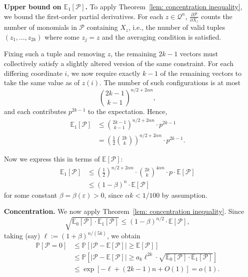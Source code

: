 \documentclass[11pt]{article}
\theoremstyle{definition}
\theoremstyle{plain}
\begin{document}
\vspace{.1 in}

{\bf Upper bound on \( \mathbb{E}_1[\mathcal{P}] \).}
To apply Theorem~\ref{lem: concentration inequality}, we bound the first-order partial derivatives. For each \( z \in \mathcal{Q}^n \), \( \frac{\partial \mathcal{P}}{\partial X_z} \) counts the number of monomials in \( \mathcal{P} \) containing \( X_z \), i.e., the number of valid tuples \( (z_1, \ldots, z_{2k}) \) where some \( z_j = z \) and the averaging condition is satisfied.

Fixing such a tuple and removing \( z \), the remaining \( 2k - 1 \) vectors must collectively satisfy a slightly altered version of the same constraint. For each differing coordinate \( i \), we now require exactly \( k - 1 \) of the remaining vectors to take the same value as of \( z(i) \). The number of such configurations is at most
\[
\binom{2k - 1}{k - 1}^{n/2 + 2\alpha n},
\]
and each contributes \( p^{2k - 1} \) to the expectation. Hence,
\begin{align*}
\mathbb{E}_1[\mathcal{P}] 
&\leq \binom{2k - 1}{k - 1}^{n/2  + 2\alpha n} \cdot p^{2k - 1} \\
&= \left( \frac{1}{2} \binom{2k}{k} \right)^{n/2 + 2\alpha n} \cdot p^{2k - 1}.
\end{align*}

Now we express this in terms of \( \mathbb{E}[\mathcal{P}] \):
\begin{align*}
\mathbb{E}_1[\mathcal{P}]
&\leq \left(\frac{1}{2}\right)^{n/2 + 2\alpha n} \cdot \binom{2k}{k}^{4\alpha n} \cdot p\cdot \mathbb{E}[\mathcal{P}] \\
&\leq (1 - \beta)^n \cdot \mathbb{E}[\mathcal{P}]
\end{align*}
for some constant \( \beta = \beta(\varepsilon) > 0 \), since \( \alpha k < 1/100 \) by assumption.

\vspace{.1 in}


{\bf Concentration.}
We now apply Theorem~\ref{lem: concentration inequality}. Since
\[
\sqrt{\mathbb{E}_0[\mathcal{P}] \cdot \mathbb{E}_1[\mathcal{P}]} \leq (1 - \beta)^{n/2} \cdot \mathbb{E}[\mathcal{P}],
\]
taking (say) \( \ell := (1 + \beta)^{n / (5k)} \), we obtain
\begin{align*}
\mathbb{P}[\mathcal{P} = 0] 
&\leq \mathbb{P}\left[ |\mathcal{P} - \mathbb{E}[\mathcal{P}]| \geq \mathbb{E}[\mathcal{P}] \right] \\
&\leq  \mathbb{P}\left[ |\mathcal{P} - \mathbb{E}[\mathcal{P}]| \geq a_k\ell^{2k} \cdot \sqrt{\mathbb{E}_0[\mathcal{P}] \cdot \mathbb{E}_1[\mathcal{P}]} \right] \\
&\leq \exp\left[ -\ell + (2k - 1)n +O(1)\right] = o(1).
\end{align*}
\end{document}
